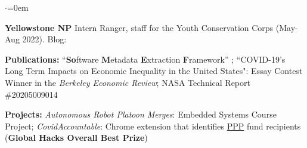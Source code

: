 \begin{list}{$\cdot$}{\leftmargin=0em} %
    \item \textbf{Yellowstone NP} Intern Ranger, staff for the Youth Conservation Corps (May-Aug 2022). Blog: \href{https://yccyellowstone.wixsite.com/2022}{\faExternalLink} 
   \item \textbf{Publications:} ``\textbf{So}ftware \textbf{M}etadata \textbf{E}xtraction \textbf{F}ramework''  \href{https://doi.org/10.1109/BigData47090.2019.9006447}{\faExternalLink}; ``COVID-19's Long Term Impacts on Economic Inequality in the United States": Essay Contest Winner in the \textit{Berkeley Economic Review}; NASA Technical Report \#20205009014 \href{https://ntrs.nasa.gov/api/citations/20205009014/downloads/MaoAllenReportF20.docx.pdf}{\faExternalLink}
   \item \textbf{Projects:} \href{https://www.youtube.com/watch?v=bHS6TTCHuLk}{\faYoutubePlay}\textit{Autonomous Robot Platoon Merges}: Embedded Systems Course Project;
   \textit{CovidAccountable}: Chrome extension that identifies \href{https://web.archive.org/web/20200903224716/https://www.sba.gov/funding-programs/loans/coronavirus-relief-options/paycheck-protection-program}{PPP} fund recipients (\textbf{Global Hacks Overall Best Prize})%
\end{list}
